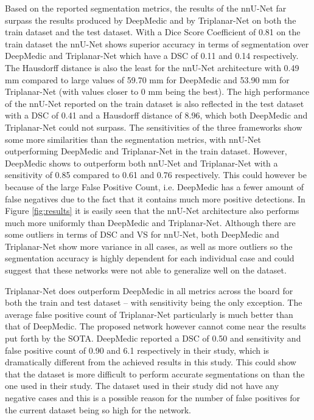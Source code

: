 Based on the reported segmentation metrics, the results of the nnU-Net far surpass the results produced by DeepMedic and by Triplanar-Net on both the train dataset and the test dataset. With a Dice Score Coefficient of 0.81 on the train dataset the nnU-Net shows superior accuracy in terms of segmentation over DeepMedic and Triplanar-Net which have a DSC of 0.11 and 0.14 respectively. The Hausdorff distance is also the least for the nnU-Net architecture with 0.49 mm compared to large values of 59.70 mm for DeepMedic and 53.90 mm for Triplanar-Net (with values closer to 0 mm being the best). The high performance of the nnU-Net reported on the train dataset is also reflected in the test dataset with a DSC of 0.41 and a Hausdorff distance of 8.96, which both DeepMedic and Triplanar-Net could not surpass. 
The sensitivities of the three frameworks show some more similarities than the segmentation metrics, with nnU-Net outperforming DeepMedic and Triplanar-Net in the train dataset. However, DeepMedic shows to outperform both nnU-Net and Triplanar-Net with a sensitivity of 0.85 compared to 0.61 and 0.76 respectively. This could however be because of the large False Positive Count, i.e. DeepMedic has a fewer amount of false negatives due to the fact that it contains much more positive detections. In Figure \ref{fig:results} it is easily seen that the nnU-Net architecture also performs much more uniformly than DeepMedic and Triplanar-Net. Although there are some outliers in terms of DSC and VS for nnU-Net, both DeepMedic and Triplanar-Net show more variance in all cases, as well as more outliers so the segmentation accuracy is highly dependent for each individual case and could suggest that these networks were not able to generalize well on the dataset. 

Triplanar-Net does outperform DeepMedic in all metrics across the board for both the train and test dataset -- with sensitivity being the only exception. The average false positive count of Triplanar-Net particularly is much better than that of DeepMedic. The proposed network however cannot come near the results put forth by the SOTA. DeepMedic reported a DSC of 0.50 and sensitivity and false positive count of 0.90 and 6.1 respectively in their study, which is dramatically different from the achieved results in this study. This could show that the dataset is more difficult to perform accurate segmentations on than the one used in their study. The dataset used in their study did not have any negative cases and this is a possible reason for the number of false positives for the current dataset being so high for the network. 

